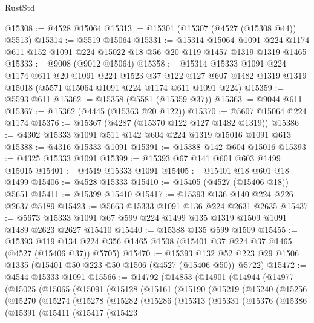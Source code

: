 \begin{lexlean}{RustStd}
\begin{coremodule}
{\begin{coremodule}
{{{{{{{{{{{{{{{{{{{{{{{{{{{{{{{{{{{{{{@15308 := @4528 @15064
@15313 := @15301 (@15307 (@4527 (@15308 @44)) @5513)
@15314 := @5519 @15064
@15331 := @15314
    @15064
    @1091
    @224
    @1174
    @611
    @152
    @1091
    @224
    @15022
    @18
    @56
    @20
    @119
    @1457
    @1319
    @1319
    @1465
@15333 := @9008 (@9012 @15064)
@15358 := @15314
    @15333
    @1091
    @224
    @1174
    @611
    @20
    @1091
    @224
    @1523
    @37
    @122
    @127
    @607
    @1482
    @1319
    @1319
    @15018
    (@5571 @15064 @1091 @224 @1174 @611 @1091 @224)
@15359 := @5593 @611
@15362 := @15358 (@5581 (@15359 @37))
@15363 := @9044 @611
@15367 := @15362 (@4445 (@15363 @20 @122))
@15370 := @5607 @15064 @224 @1174
@15376 := @15367 (@4287 (@15370 @122 @127 @1482 @1319))
@15386 := @4302 @15333 @1091 @511 @142 @604 @224 @1319 @15016 @1091 @613
@15388 := @4316 @15333 @1091
@15391 := @15388 @142 @604 @15016
@15393 := @4325 @15333 @1091
@15399 := @15393 @67 @141 @601 @603 @1499 @15015
@15401 := @4519 @15333 @1091
@15405 := @15401 @18 @601 @18 @1499
@15406 := @4528 @15333
@15410 := @15405 (@4527 (@15406 @18)) @5651
@15411 := @15399 @15410
@15417 := @15393 @136 @140 @224 @226 @2637 @5189
@15423 := @5663 @15333 @1091 @136 @224 @2631 @2635
@15437 := @5673 @15333 @1091 @67 @599 @224 @1499 @135 @1319 @1509 @1091 @1489 @2623 @2627 @15410
@15440 := @15388 @135 @599 @1509
@15455 := @15393
    @119
    @134
    @224
    @356
    @1465
    @1508
    (@15401 @37 @224 @37 @1465 (@4527 (@15406 @37)) @5705)
@15470 := @15393
    @132
    @52
    @223
    @29
    @1506
    @1335
    (@15401 @50 @223 @50 @1506 (@4527 (@15406 @50)) @5722)
@15472 := @4544 @15333 @1091
@15566 := @14792
    (@14853
      (@14901
        (@14944
          (@14977
            (@15025
              (@15065
                (@15091
                  (@15128
                    (@15161
                      (@15190
                        (@15219
                          (@15240
                            (@15256
                              (@15270
                                (@15274
                                  (@15278
                                    (@15282
                                      (@15286
                                        (@15313
                                          (@15331
                                            (@15376
                                              (@15386
                                                (@15391
                                                  (@15411
                                                    (@15417
                                                      (@15423
}}}}}}}}}}}}}}}}}}}}}}}}}}}}}}}}}}}}}}
\end{coremodule}}
\end{coremodule}
\end{lexlean}
